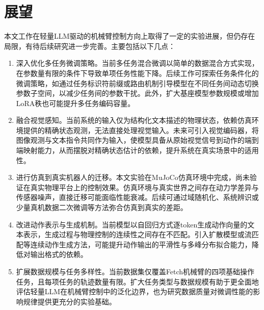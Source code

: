 \section{展望}\label{sec:conclusion-outlook}

本文工作在轻量LLM驱动的机械臂控制方向上取得了一定的实验进展，但仍存在局限，有待后续研究进一步完善。主要包括以下几点：

\begin{enumerate}
  \item 深入优化多任务微调策略。当前多任务混合微调以简单的数据混合方式实现，在参数量有限的条件下导致单项任务性能下降。后续工作可探索任务条件化的微调策略，如通过任务标识符前缀或路由机制引导模型在不同任务间动态切换参数子空间，以减少任务间的参数干扰。此外，扩大基座模型参数规模或增加LoRA秩也可能提升多任务编码容量。
  \item 融合视觉感知。当前系统的输入仅为结构化文本描述的物理状态，依赖仿真环境提供的精确状态观测，无法直接处理视觉输入。未来可引入视觉编码器，将图像观测与文本指令共同作为输入，使模型具备从原始视觉信号到动作的端到端映射能力，从而摆脱对精确状态估计的依赖，提升系统在真实场景中的适用性。
  \item 进行仿真到真实机器人的迁移。本文实验在MuJoCo仿真环境中完成，尚未验证在真实物理平台上的控制效果。仿真环境与真实世界之间存在动力学差异与传感器噪声，直接迁移可能面临性能衰减。后续可通过域随机化、系统辨识或少量真机数据二次微调等方法弥合仿真到真实的差距。
  \item 改进动作表示与生成机制。当前模型以自回归方式逐token生成动作向量的文本表示，生成过程与物理控制的连续性之间存在不匹配。引入扩散模型或流匹配等连续动作生成方法，可能提升动作输出的平滑性与多峰分布拟合能力，降低对输出格式的依赖。
  \item 扩展数据规模与任务多样性。当前数据集仅覆盖Fetch机械臂的四项基础操作任务，且每项任务的轨迹数量有限。扩大任务类型与数据规模有助于更全面地评估轻量LLM在机械臂控制中的泛化边界，也为研究数据质量对微调性能的影响规律提供更充分的实验基础。
\end{enumerate}
